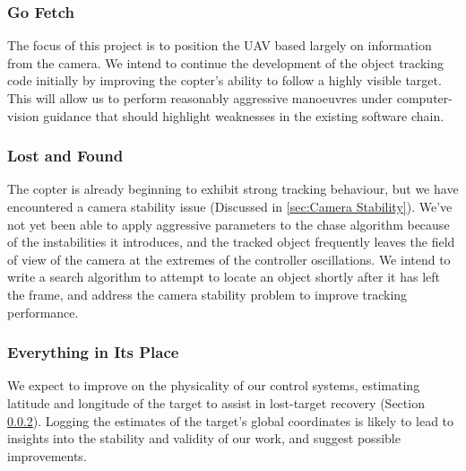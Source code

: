 \documentclass[a4paper, 11pt, titlepage]{article}
\begin{document}
    \subsubsection{Go Fetch}
      The focus of this project is to position the UAV based largely on information from the camera.  We intend to continue the development of the object tracking code initially by improving the copter's ability to follow a highly visible target.  This will allow us to perform reasonably aggressive manoeuvres under computer-vision guidance that should highlight weaknesses in the existing software chain.

    \subsubsection{Lost and Found}
    \label{sec:Lost and Found}
      The copter is already beginning to exhibit strong tracking behaviour, but we have encountered a camera stability issue (Discussed in \ref{sec:Camera Stability}).
      We've not yet been able to apply aggressive parameters to the chase algorithm because of the instabilities it introduces, and the tracked object frequently leaves the field of view of the camera at the extremes of the controller oscillations.
      We intend to write a search algorithm to attempt to locate an object shortly after it has left the frame, and address the camera stability problem to improve tracking performance.

    \subsubsection{Everything in Its Place}      

      We expect to improve on the physicality of our control systems, estimating latitude and longitude of the target to assist in lost-target recovery (Section \ref{sec:Lost and Found}).  Logging the estimates of the target's global coordinates is likely to lead to insights into the stability and validity of our work, and suggest possible improvements.
\end{document}
